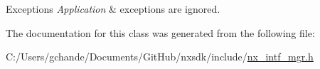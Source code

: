 \begin{DoxyExceptions}{Exceptions}
{\em Application} & exceptions are ignored. \\
\hline
\end{DoxyExceptions}


The documentation for this class was generated from the following file\+:\begin{DoxyCompactItemize}
\item 
C\+:/\+Users/gchande/\+Documents/\+Git\+Hub/nxsdk/include/\mbox{\hyperlink{nx__intf__mgr_8h}{nx\+\_\+intf\+\_\+mgr.\+h}}\end{DoxyCompactItemize}
